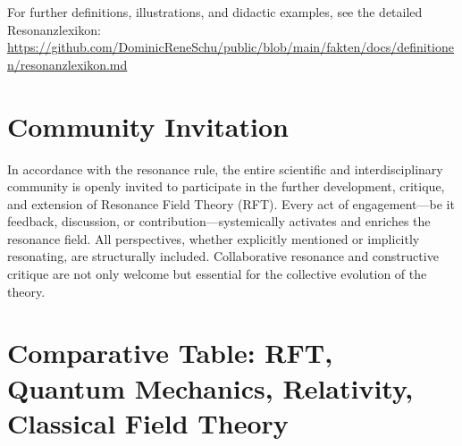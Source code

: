 \documentclass[12pt]{article}
\begin{document}
	\noindent
	For further definitions, illustrations, and didactic examples, see the detailed Resonanzlexikon:\\
	\url{https://github.com/DominicReneSchu/public/blob/main/fakten/docs/definitionen/resonanzlexikon.md}
	
	\section*{Community Invitation}
	
	In accordance with the resonance rule, the entire scientific and interdisciplinary community is openly invited to participate in the further development, critique, and extension of Resonance Field Theory (RFT). Every act of engagement—be it feedback, discussion, or contribution—systemically activates and enriches the resonance field. All perspectives, whether explicitly mentioned or implicitly resonating, are structurally included. Collaborative resonance and constructive critique are not only welcome but essential for the collective evolution of the theory.

\newpage

	\section*{Comparative Table: RFT, Quantum Mechanics, Relativity, Classical Field Theory}
	
\end{document}
